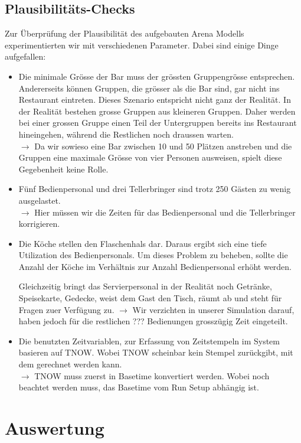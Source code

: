 \documentclass[ngerman,a4paper,12pt]{scrreprt}
\begin{document}
	\section{Plausibilitäts-Checks}
	Zur Überprüfung der Plausibilität des aufgebauten Arena Modells experimentierten wir mit verschiedenen Parameter. Dabei sind einige Dinge aufgefallen:
	\begin{itemize}
		\item Die minimale Grösse der Bar muss der grössten Gruppengrösse entsprechen. Andererseits können Gruppen, die grösser als die Bar sind, gar nicht ins Restaurant eintreten.
		Dieses Szenario entspricht nicht ganz der Realität. In der Realität bestehen grosse Gruppen aus kleineren Gruppen. Daher werden bei einer grossen Gruppe einen Teil der Untergruppen bereits ins Restaurant hineingehen, während die Restlichen noch draussen warten.\\
		$\rightarrow$ Da wir sowieso eine Bar zwischen 10 und 50 Plätzen anstreben und die Gruppen eine maximale Grösse von vier Personen ausweisen, spielt diese Gegebenheit keine Rolle.
		\item Fünf Bedienpersonal und drei Tellerbringer sind trotz 250 Gästen zu wenig ausgelastet.\\
		$\rightarrow$ Hier müssen wir die Zeiten für das Bedienpersonal und die Tellerbringer korrigieren.
		\item Die Köche stellen den Flaschenhals dar. Daraus ergibt sich eine tiefe Utilization des Bedienpersonals. Um dieses Problem zu beheben, sollte die Anzahl der Köche im Verhältnis zur Anzahl Bedienpersonal erhöht werden.
		
		Gleichzeitig bringt das Servierpersonal in der Realität noch Getränke, Speisekarte, Gedecke, weist dem Gast den Tisch, räumt ab und steht für Fragen zuer Verfügung zu.
		$\rightarrow$ Wir verzichten in unserer Simulation darauf, haben jedoch für die restlichen ??? Bedienungen grosszügig Zeit eingeteilt.
		\item Die benutzten Zeitvariablen, zur Erfassung von Zeitstempeln im System basieren auf TNOW. Wobei TNOW scheinbar kein Stempel zurückgibt, mit dem gerechnet werden kann.\\
		$\rightarrow$ TNOW muss zuerst in Basetime konvertiert werden. Wobei noch beachtet werden muss, das Basetime vom Run Setup abhängig ist.
	\end{itemize}
			

\chapter{Auswertung}
\end{document}
